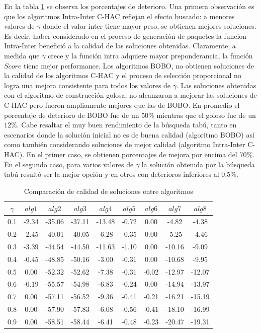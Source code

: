 En la tabla \ref{tabla:comp1} se observa los porcentajes de deterioro. Una primera observación es que los algoritmos  Intra-Inter C-HAC reflejan el efecto buscado: a menores valores de $\gamma$ donde el valor inter tiene mayor peso, se obtienen mejores soluciones. Es decir, haber considerado en el proceso de generación de paquetes la funcion Intra-Inter benefició a la calidad de las soluciones obtenidas. Claramente, a medida que $\gamma$ crece y la función intra adquiere mayor preponderancia, la función $Score$ tiene mejor performance. Los algoritmos BOBO, no obtienen soluciones de la calidad de los algoritmos C-HAC y el proceso de selección proporcional no logra una mejora consistente para todos los valores de $\gamma$. Las soluciones obtenidas con el algoritmo de construcción golosa, no alcanzaron a mejorar las soluciones de C-HAC pero fueron ampliamente mejores que las de BOBO. En promedio el porcentaje de deterioro de BOBO fue de un $50\%$ mientras que el goloso fue de un $12\%$. 
Cabe resaltar el muy buen rendimiento de la búsqueda tabú, tanto en escenarios donde la solución inicial no es de buena calidad (algoritmo BOBO) así como también considerando soluciones de mejor calidad (algoritmo Intra-Inter C-HAC). En el primer caso, se obtienen porcentajes de mejora por encima del $70\%$. En el segundo caso, para varios valores de $\gamma$ la solución obtenida por la búsqueda tabú resultó ser la mejor opción y en otros con deterioros inferiores al $0.5\%$.
\begin{table}
\begin{center}
\begin{tabular}{|c|c|c|c|c|c|c|c|c|}
\hline
$\gamma$&$alg1$&$alg2$&$alg3$&$alg4$&$alg5$&$alg6$&$alg7$&$alg8$ \\ \hline
0.1 & -2.34	& -35.06 & -37.11 & -13.48 & -0.72 &  0.00 &  -4.82 &  -4.38 \\
0.2 & -2.45	& -40.01 & -40.05 & -6.28 & -0.35 &  0.00 &  -5.25 &  -4.46 \\
0.3 & -3.39	& -44.54 & -44.50 & -11.63 & -1.10 &  0.00 & -10.16 &  -9.09 \\
0.4 & -0.45	& -48.85 & -50.16 & -3.00 & -0.31 &  0.00 & -10.68 &  -9.95 \\
0.5 & 0.00  & -52.32 & -52.62 & -7.38 & -0.31 & -0.02 & -12.97 & -12.07 \\
0.6 & -0.19 & -55.57 & -54.98 & -6.83 & -0.24 &  0.00 & -14.94 & -13.97 \\
0.7 & 0.00  & -57.11 & -56.52 & -9.36 & -0.41 & -0.21 & -16.21 & -15.19 \\
0.8 & 0.00  & -57.90 & -57.83 & -6.08 & -0.56 & -0.41 & -18.10 & -16.99 \\
0.9 & 0.00  & -58.51 & -58.44 & -6.41 & -0.48 & -0.23 & -20.47 & -19.31 \\ \hline 
\end{tabular}
\caption{Comparaci\'on de calidad de soluciones entre algoritmos} 
\label{tabla:comp1}
\end{center}
\end{table}

